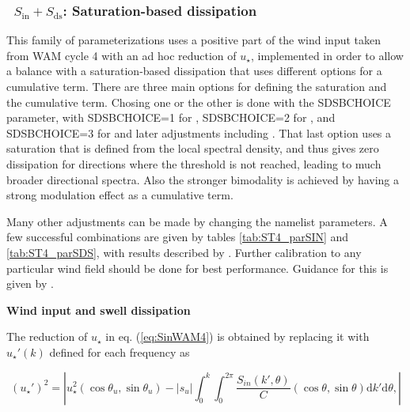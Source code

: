 \vsssub
\subsubsection{~$S_{\mathrm{in}} + S_{\mathrm{ds}}$: Saturation-based dissipation} \label{sec:ST4}
\vsssub


\noindent 
This family of parameterizations uses a positive part of the wind input taken
from WAM cycle 4 with an ad hoc reduction of $u_\star$, implemented in
order to allow a balance with a saturation-based dissipation that uses different options for 
a cumulative term. There are three main options for defining the saturation and the cumulative term. Chosing one or the other is done with the  {\F SDSBCHOICE} parameter, with  {\F SDSBCHOICE=1} for \cite{art:Aea10},  {\F SDSBCHOICE=2} for \cite{Filipot&Ardhuin2012}, and {\F SDSBCHOICE=3} for \cite{Romero2019} and later adjustments including \cite{art:AA23}. That last option uses a saturation that is defined from the local spectral density, and thus gives zero dissipation for directions where the threshold is not reached, leading to much broader directional spectra. Also the stronger bimodality is achieved by having a strong modulation effect as a cumulative term. 

Many other adjustments can be made by changing the namelist parameters. A few successful combinations 
are given by tables \ref{tab:ST4_parSIN} and \ref{tab:ST4_parSDS}, with results described by \citep{art:RA13,art:SAG16,art:AA23}. 
Further calibration to any particular wind field should be done for best performance. Guidance for this is given by \cite{Stopa2018}. 

\vsssub
\textbf{Wind input and swell dissipation} 
\vsssub


The reduction of $u_\star$ in
eq. (\ref{eq:SinWAM4}) is obtained by replacing it with $u_\star '(k)$ defined for each
frequency as

\begin{equation}
\left(u_\star '\right)^2=\left|u_\star^2 \left(\cos \theta_u, \sin
\theta_u \right) - \left|s_u\right| \int_0^k \int_0^{2 \pi}
\frac{S_{in}\left(k',\theta \right)}{C}  \left(\cos \theta, \sin
\theta \right)  {\mathrm d} k' \mathrm d
\theta,\label{ustarp}\right|
\end{equation}

